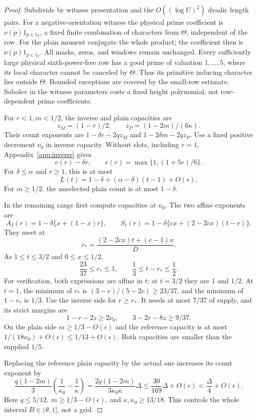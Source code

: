 \documentclass[12pt]{article}
\begin{document}
\begin{proof}
Subdivide by witness presentation and the
\(O((\log U)^2)\) dyadic length pairs.
For a negative-orientation witness the physical prime coefficient
is \(\overline{\nu(p)}1_{p\in1_T}\), a fixed finite combination
of characters from \(\Theta\), independent of the row.
For the plain moment conjugate the whole product; the coefficient
then is \(\nu(p)1_{p\in1_T}\).
All masks, zeros, and windows remain unchanged.
Every sufficiently large physical sixth-power-free row has a good
prime of valuation \(1,\ldots,5\), where its local character
cannot be canceled by \(\Theta\).
Thus its primitive inducing character lies outside \(\Theta\).
Bounded exceptions are covered by the small-row estimate.
Sobolev in the witness parameters costs a fixed height polynomial,
not row-dependent prime coefficients.

For \(r<1,m<1/2\), the inverse and plain capacities are
\[
 z_M=(1-r)/2,\qquad z_P=(1-2m)/(6\kappa).
\]
Their count exponents are \(1-\delta r-2qz_M\) and
\(1-2\delta m-2qz_P\).
Use a fixed positive decrement \(\nu_0\) in inverse capacity.
Without slots, including \(r=1\), Appendix~\ref{app:inverse} gives
\begin{equation}\label{eq:amplification}
 e(r)-\delta r,\qquad e(r)=\max\{1,(1+5r)/6\}.
\end{equation}
For \(\delta\le\alpha\) and \(r\ge1\), this is at most
\[
 L(t)=1-\delta+(\alpha-\delta)(t-1)+O(\epsilon).
\]
For \(m\ge1/2\), the unselected plain count is at most \(1-\delta\).

In the remaining range first compute capacities at \(\kappa_0\).
The two affine exponents are
\[
 A_I(r)=1-\delta\{x+(1-x)r\},\qquad
 S_t(r)=1-\delta\{cx+(2-2cx)(t-r)\}.
\]
They meet at
\[
 r_*=\frac{(2-2cx)t+(c-1)x}{D}.
\]
As \(1\le t\le3/2\) and \(0\le x\le1/2\),
\[
 \frac{23}{37}\le r_*\le1,\qquad
 \frac13\le t-r_*\le\frac12.
\]
For verification, both expressions are affine in \(t\);
at \(t=3/2\) they are \(1\) and \(1/2\).
At \(t=1\), the minimum of \(r_*\) is
\((3-c)/(5-2c)\ge23/37\), and the minimum of \(1-r_*\)
is \(1/3\).
Use the inverse side for \(r\ge r_*\).
It needs at most \(7/37\) of supply, and its strict margins are
\[
 1-r-2z\ge2\nu_0,\qquad 3-2r-8z\ge9/37.
\]
On the plain side \(m\ge1/3-O(\epsilon)\) and the reference
capacity is at most \(1/(18\kappa_0)+O(\epsilon)\le1/13+O(\epsilon)\).
Both capacities are smaller than the supplied \(1/5\).

Replacing the reference plain capacity by the actual one
increases its count exponent by
\[
 \frac{q(1-2m)}3\left(\frac1{\kappa_0}-\frac1\kappa\right)
 =\frac{2q(1-2m)}{3\kappa_0\kappa}\Delta
 \le\frac{30}{169}\Delta+O(\epsilon)
 <\frac\Delta4+O(\epsilon).
\]
Here \(q\le5/12,\ m\ge1/3-O(\epsilon)\), and
\(\kappa,\kappa_0\ge13/18\).
This controls the whole interval \(B\in(\theta,1]\), not a grid.


\end{proof}
\end{document}
